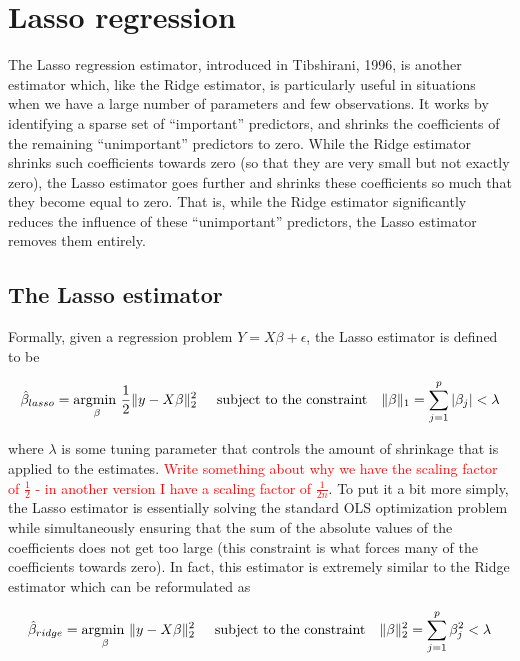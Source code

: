 \chapter{Lasso regression}
\label{ch:lasso}


The Lasso regression estimator, introduced in Tibshirani, 1996, is another estimator which, like the Ridge estimator, is particularly useful in situations when we have a large number of parameters and few observations. It works by identifying a sparse set of ``important'' predictors, and shrinks the coefficients of the remaining ``unimportant'' predictors to zero. While the Ridge estimator shrinks such coefficients towards zero (so that they are very small but not exactly zero), the Lasso estimator goes further and shrinks these coefficients so much that they become equal to zero. That is, while the Ridge estimator significantly reduces the influence of these ``unimportant'' predictors, the Lasso estimator removes them entirely. 

\section{The Lasso estimator}

Formally, given a regression problem $Y = X \beta + \epsilon$, the Lasso estimator is defined to be

\begin{equation}
\hat{\beta}_{lasso} = \underset{\beta}{\text{argmin }} \frac12 \|y - X \beta \|_2^2 \hspace{0.5cm} \text{subject to the constraint } ~~ \|\beta\|_1 = \sum_{j=1}^p |\beta_j| < \lambda
\end{equation}

where $\lambda$ is some tuning parameter that controls the amount of shrinkage that is applied to the estimates. \textcolor{red}{Write something about why we have the scaling factor of $\frac12$ - in another version I have a scaling factor of $\frac{1}{2n}$}. To put it a bit more simply, the Lasso estimator is essentially solving the standard OLS optimization problem while simultaneously ensuring that the sum of the absolute values of the coefficients does not get too large (this constraint is what forces many of the coefficients towards zero). In fact, this estimator is extremely similar to the Ridge estimator which can be reformulated as

\begin{equation}
\hat{\beta}_{ridge} = \underset{\beta}{\text{argmin }}  \|y - X \beta \|_2^2 \hspace{0.5cm} \text{subject to the constraint } ~~ \|\beta\|_2^2 = \sum_{j=1}^p \beta_j^2 < \lambda
\end{equation}


